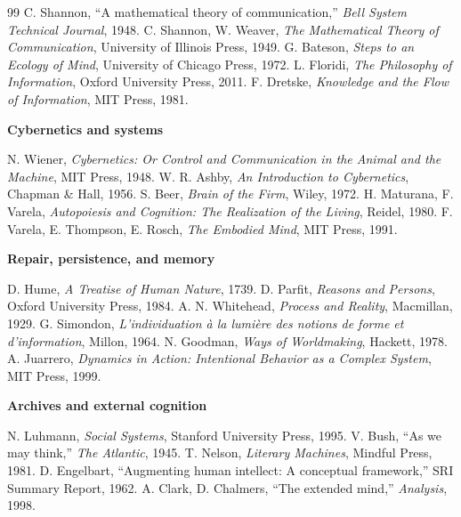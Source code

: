 \documentclass[11pt]{book}
\begin{document}
\begin{thebibliography}{99}
 C. Shannon, ``A mathematical theory of communication,'' \textit{Bell System Technical Journal}, 1948.
 C. Shannon, W. Weaver, \textit{The Mathematical Theory of Communication}, University of Illinois Press, 1949.
 G. Bateson, \textit{Steps to an Ecology of Mind}, University of Chicago Press, 1972.
 L. Floridi, \textit{The Philosophy of Information}, Oxford University Press, 2011.
 F. Dretske, \textit{Knowledge and the Flow of Information}, MIT Press, 1981.

\item[] \textbf{Cybernetics and systems}

 N. Wiener, \textit{Cybernetics: Or Control and Communication in the Animal and the Machine}, MIT Press, 1948.
 W. R. Ashby, \textit{An Introduction to Cybernetics}, Chapman \& Hall, 1956.
 S. Beer, \textit{Brain of the Firm}, Wiley, 1972.
 H. Maturana, F. Varela, \textit{Autopoiesis and Cognition: The Realization of the Living}, Reidel, 1980.
 F. Varela, E. Thompson, E. Rosch, \textit{The Embodied Mind}, MIT Press, 1991.

\item[] \textbf{Repair, persistence, and memory}

 D. Hume, \textit{A Treatise of Human Nature}, 1739.
 D. Parfit, \textit{Reasons and Persons}, Oxford University Press, 1984.
 A. N. Whitehead, \textit{Process and Reality}, Macmillan, 1929.
 G. Simondon, \textit{L'individuation \`a la lumi\`ere des notions de forme et d'information}, Millon, 1964.
 N. Goodman, \textit{Ways of Worldmaking}, Hackett, 1978.
 A. Juarrero, \textit{Dynamics in Action: Intentional Behavior as a Complex System}, MIT Press, 1999.

\item[] \textbf{Archives and external cognition}

 N. Luhmann, \textit{Social Systems}, Stanford University Press, 1995.
 V. Bush, ``As we may think,'' \textit{The Atlantic}, 1945.
 T. Nelson, \textit{Literary Machines}, Mindful Press, 1981.
 D. Engelbart, ``Augmenting human intellect: A conceptual framework,'' SRI Summary Report, 1962.
 A. Clark, D. Chalmers, ``The extended mind,'' \textit{Analysis}, 1998.


\end{thebibliography}
\end{document}
